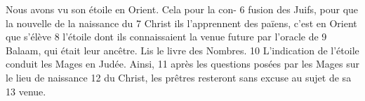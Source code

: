 Nous avons vu son étoile en Orient. Cela pour la con-	 
6	 	fusion des Juifs, pour que la nouvelle de la naissance du	 
7	 	Christ ils l'apprennent des païens, c'est en Orient que s'élève	 
8	 	l'étoile dont ils connaissaient la venue future par l'oracle de	 
9	 	Balaam, qui était leur ancêtre. Lis le livre des Nombres.	 
10	 	L'indication de l'étoile conduit les Mages en Judée. Ainsi,	 
11	 	après les questions posées par les Mages sur le lieu de naissance	 
12	 	du Christ, les prêtres resteront sans excuse au sujet de sa	 
13	 	venue.